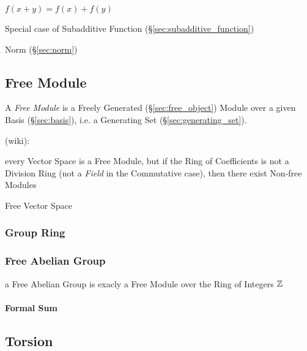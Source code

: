 $f(x + y) = f(x) + f(y)$

Special case of Subadditive Function (\S\ref{sec:subadditive_function})

Norm (\S\ref{sec:norm})



\subsection{Free Module}\label{sec:free_module}

A \emph{Free Module} is a Freely Generated (\S\ref{sec:free_object}) Module
over a given Basis (\S\ref{sec:basis}), i.e. a Generating Set
(\S\ref{sec:generating_set}).

(wiki):

every Vector Space is a Free Module, but if the Ring of Coefficients is not a
Division Ring (not a \emph{Field} in the Commutative case), then there exist
Non-free Modules

Free Vector Space



\subsubsection{Group Ring}\label{sec:group_ring}

\subsubsection{Free Abelian Group}\label{sec:free_commutative_group}

a Free Abelian Group is exacly a Free Module over the Ring of Integers $\mathbb{Z}$



\paragraph{Formal Sum}\label{sec:formal_sum}\hfill



\subsection{Torsion}\label{sec:torsion}

